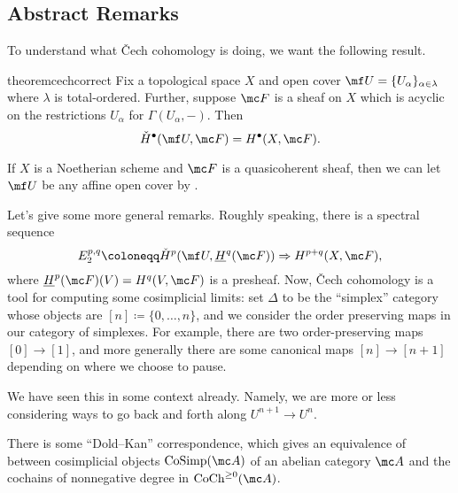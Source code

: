 \documentclass[../notes.tex]{subfiles}
\begin{document}
\subsection{Abstract Remarks}
To understand what \v Cech cohomology is doing, we want the following result.
\begin{restatable}{theorem}{cechcorrect} \label{thm:cech-is-correct}
	Fix a topological space $X$ and open cover $\mf U=\{U_\alpha\}_{\alpha\in\lambda}$ where $\lambda$ is total-ordered. Further, suppose $\mc F$ is a sheaf on $X$ which is acyclic on the restrictions $U_\alpha$ for $\Gamma(U_\alpha,-)$. Then
	\[\check H^\bullet(\mf U,\mc F)=H^\bullet(X,\mc F).\]
\end{restatable}
\begin{example}
	If $X$ is a Noetherian scheme and $\mc F$ is a quasicoherent sheaf, then we can let $\mf U$ be any affine open cover by .
\end{example}
Let's give some more general remarks. Roughly speaking, there is a spectral sequence
\[E_2^{p,q}\coloneqq\check H^p(\mf U,\underline H^q(\mc F))\Rightarrow H^{p+q}(X,\mc F),\]
where $\underline H^p(\mc F)(V)=H^q(V,\mc F)$ is a presheaf. Now, \v Cech cohomology is a tool for computing some cosimplicial limits: set $\Delta$ to be the ``simplex'' category whose objects are $[n]\coloneqq\{0,\ldots,n\}$, and we consider the order preserving maps in our category of simplexes. For example, there are two order-preserving maps $[0]\to[1]$, and more generally there are some canonical maps $[n]\to[n+1]$ depending on where we choose to pause.
\begin{remark}
	We have seen this in some context already. Namely, we are more or less considering ways to go back and forth along $U^{n+1}\to U^n$.
\end{remark}
There is some ``Dold--Kan'' correspondence, which gives an equivalence of between cosimplicial objects $\mathrm{CoSimp}(\mc A)$ of an abelian category $\mc A$ and the cochains of nonnegative degree in $\mathrm{CoCh}^{\ge0}(\mc A)$.
\end{document}

